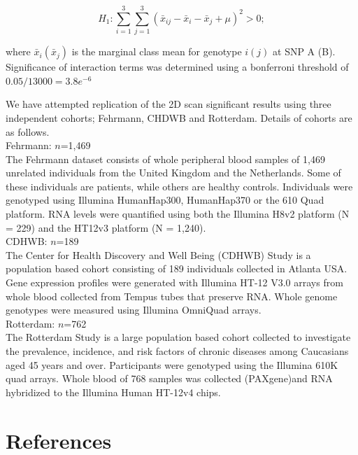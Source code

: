 \documentclass{article}
\begin{document}
\begin{equation}
H _1: \sum _{i=1} ^3 \sum _{j=1} ^3 (\bar x _{ij} - \bar x _i - \bar x _j + \mu) ^2 > 0;
\label{eq:4df}
\end{equation}

where $\bar x _i (\bar x _j)$ is the marginal class mean for genotype $i (j)$ at SNP A (B). Significance of interaction terms was determined using a bonferroni threshold of $0.05 / 13000 = 3.8e^{-6}$ 

We have attempted replication of the 2D scan significant results using three independent cohorts; Fehrmann, CHDWB and Rotterdam. Details of cohorts are as follows. \\[0.1cm]  

Fehrmann: $n$=1,469 \\[0.1cm]
The Fehrmann dataset consists of whole peripheral blood samples of 1,469 unrelated individuals from the United Kingdom and the Netherlands. Some of these individuals are patients, while others are healthy controls. Individuals were genotyped using Illumina HumanHap300, HumanHap370 or the 610 Quad platform. RNA levels were quantified using both the Illumina H8v2 platform (N = 229) and the HT12v3 platform (N = 1,240). \\[0.1cm]

CDHWB: $n$=189 \\ [0.1cm]
The Center for Health Discovery and Well Being (CDHWB) Study is a population based cohort consisting of 189 individuals collected in Atlanta USA. Gene expression profiles were generated with Illumina HT-12 V3.0 arrays from whole blood collected from Tempus tubes that preserve RNA. Whole genome genotypes were measured using Illumina OmniQuad arrays. \\[0.1cm]

Rotterdam: $n$=762 \\[0.1cm]
The Rotterdam Study is a large population based cohort collected to investigate the prevalence, incidence, and risk factors of chronic diseases among  Caucasians aged 45 years and over. Participants were genotyped using the Illumina 610K quad arrays. Whole blood of 768 samples was collected (PAXgene)and RNA hybridized to the Illumina Human HT-12v4 chips.



\clearpage
\section{References}

\end{document}
